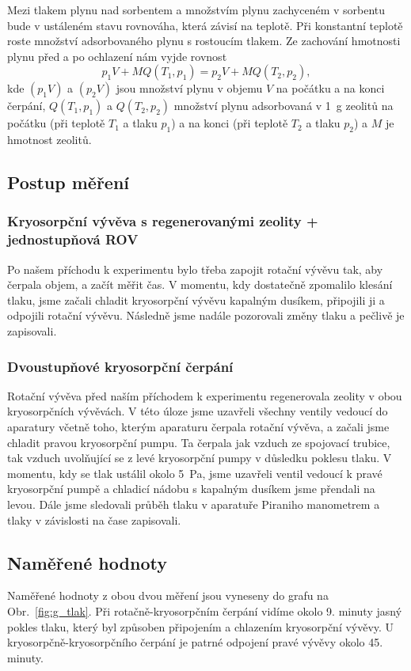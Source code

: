\documentclass[english]{article}
\begin{document}
		Mezi tlakem plynu nad sorbentem a množstvím plynu zachyceném v sorbentu bude v ustáleném stavu rovnováha, která závisí na teplotě. Při konstantní teplotě roste množství adsorbovaného plynu s rostoucím tlakem. Ze zachování hmotnosti plynu před a po ochlazení nám vyjde rovnost 
		\begin{equation}
			p_1 V + M Q(T_1, p_1) = p_2 V + M Q(T_2, p_2),
			\label{eq:rovnovaha}
		\end{equation}
		kde $(p_1V)$ a $(p_2V)$ jsou množství plynu v objemu $V$ na počátku a na konci čerpání, $Q(T_1, p_1)$ a $Q(T_2, p_2)$ množství plynu adsorbovaná v 1~g zeolitů na počátku (při teplotě $T_1$ a tlaku $p_1$) a na konci (při teplotě $T_2$ a tlaku $p_2$) a $M$ je hmotnost zeolitů.
	
\subsection{Postup měření}
	\subsubsection{Kryosorpční vývěva s regenerovanými zeolity + jednostupňová ROV}
		Po našem příchodu k experimentu bylo třeba zapojit rotační vývěvu tak, aby čerpala objem, a začít měřit čas. V momentu, kdy dostatečně zpomalilo klesání tlaku, jsme začali chladit kryosorpční vývěvu kapalným dusíkem, připojili ji a odpojili rotační vývěvu. Následně jsme nadále pozorovali změny tlaku a pečlivě je zapisovali.

	\subsubsection{Dvoustupňové kryosorpční čerpání}
		Rotační vývěva před naším příchodem k experimentu regenerovala zeolity v obou kryosorpčních vývěvách. V této úloze jsme uzavřeli všechny ventily vedoucí do aparatury včetně toho, kterým aparaturu čerpala rotační vývěva, a začali jsme chladit pravou kryosorpční pumpu. Ta čerpala jak vzduch ze spojovací trubice, tak vzduch uvolňující se z levé kryosorpční pumpy v důsledku poklesu tlaku. V momentu, kdy se tlak ustálil okolo 5~Pa, jsme uzavřeli ventil vedoucí k pravé kryosorpční pumpě a chladicí nádobu s kapalným dusíkem jsme přendali na levou. Dále jsme sledovali průběh tlaku v aparatuře Piraniho manometrem a tlaky v závislosti na čase zapisovali.
	
\subsection{Naměřené hodnoty}
	Naměřené hodnoty z obou dvou měření jsou vyneseny do grafu na Obr.~\ref{fig:g_tlak}. Při rotačně-kryosorpčním čerpání vidíme okolo 9. minuty jasný pokles tlaku, který byl způsoben připojením a chlazením kryosorpční vývěvy. U kryosorpčně-kryosorpčního čerpání je patrné odpojení pravé vývěvy okolo 45. minuty.
	
\end{document}
